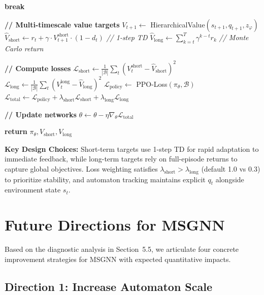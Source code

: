 \documentclass[journal]{IEEEtran}
\begin{document}
\begin{algorithm}[htbp]
\begin{algorithmic}[1]
			\STATE \textbf{break}
		\ENDIF
	\ENDFOR
    
	\STATE \textbf{// Multi-timescale value targets}
		\STATE $V_{t+1} \gets$ HierarchicalValue$(s_{t+1}, q_{t+1}, z_\varphi)$
		\STATE $\hat{V}_{\text{short}} \gets r_t + \gamma \cdot V_{t+1}^{\text{short}} \cdot (1 - d_t)$ \hfill \textit{// 1-step TD}
		\STATE $\hat{V}_{\text{long}} \gets \sum_{k=t}^{T} \gamma^{k-t} r_k$ \hfill \textit{// Monte Carlo return}
	\ENDFOR
    
	\STATE \textbf{// Compute losses}
	\STATE $\mathcal{L}_{\text{short}} \gets \frac{1}{|\mathcal{B}|} \sum_t (V_t^{\text{short}} - \hat{V}_{\text{short}})^2$
	\STATE $\mathcal{L}_{\text{long}} \gets \frac{1}{|\mathcal{B}|} \sum_t (V_t^{\text{long}} - \hat{V}_{\text{long}})^2$
	\STATE $\mathcal{L}_{\text{policy}} \gets$ PPO-Loss$(\pi_\theta, \mathcal{B})$
	\STATE $\mathcal{L}_{\text{total}} \gets \mathcal{L}_{\text{policy}} + \lambda_{\text{short}} \mathcal{L}_{\text{short}} + \lambda_{\text{long}} \mathcal{L}_{\text{long}}$
    
	\STATE \textbf{// Update networks}
	\STATE $\theta \gets \theta - \eta \nabla_\theta \mathcal{L}_{\text{total}}$
\ENDFOR

\STATE \textbf{return} $\pi_\theta, V_{\text{short}}, V_{\text{long}}$
\end{algorithmic}
\end{algorithm}

	\textbf{Key Design Choices:}
Short-term targets use 1-step TD for rapid adaptation to immediate feedback, while long-term targets rely on full-episode returns to capture global objectives. Loss weighting satisfies $\lambda_{\text{short}} > \lambda_{\text{long}}$ (default 1.0 vs 0.3) to prioritize stability, and automaton tracking maintains explicit $q_t$ alongside environment state $s_t$.


\section{Future Directions for MSGNN}
\label{app:future_directions}

Based on the diagnostic analysis in Section~5.5, we articulate four concrete improvement strategies for MSGNN with expected quantitative impacts.

\subsection{Direction 1: Increase Automaton Scale}
\end{document}
